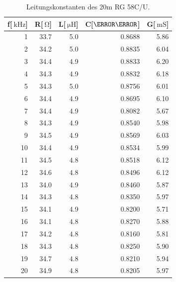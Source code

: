 \begin{table}
\centering
	\caption[]{Leitungskonstanten des 20m RG 58C/U.}
	\begin{tabular}{r r r r r}
		f[$\SI{}{\kilo\hertz}$] & R[$\SI{}{\ohm}$] & L[$\SI{}{\micro\henry}$] & C[$\nano\farad$] & G[$\SI{}{\milli\siemens}$]\\
		\hline \hline
			  1	 &	33.7	&	5.0	&	0.8688	&	5.86\\
			  2	 &	34.2	&	5.0	&	0.8835	&	6.04\\
			  3	 &	34.4	&	4.9	&	0.8833	&	6.20\\
			  4	 &	34.3	&	4.9	&	0.8832	&	6.18\\
			  5	 &	34.3	&	5.0	&	0.8756	&	6.01\\
			  6	 &	34.4	&	4.9	&	0.8695	&	6.10\\
			  7	 &	34.4	&	4.9	&	0.8082	&	5.67\\
			  8	 &	34.3	&	4.9	&	0.8540	&	5.98\\
			  9	 &	34.5	&	4.9	&	0.8569	&	6.03\\
			 10  &	34.4	&	4.9	&	0.8534	&	5.99\\
			 11	 &	34.5	&	4.8	&	0.8518	&	6.12\\
			 12	 &	34.6	&	4.8	&	0.8496	&	6.12\\
			 13	 &	34.0	&	4.9	&	0.8460	&	5.87\\
			 14	 &	34.3	&	4.8	&	0.8350	&	5.97\\
			 15	 &	34.1	&	4.9	&	0.8200	&	5.71\\
			 16	 &	34.1	&	4.8	&	0.8270	&	5.88\\
			 17	 &	34.2	&	4.8	&	0.8160	&	5.81\\
			 18	 &	34.3	&	4.8	&	0.8250	&	5.90\\
			 19	 &	34.7	&	4.8	&	0.8210	&	5.94\\
			 20	 &	34.9	&	4.8	&	0.8205	&	5.97\\
			\hline
	\end{tabular}
	\label{tab_konst2}
\end{table}

